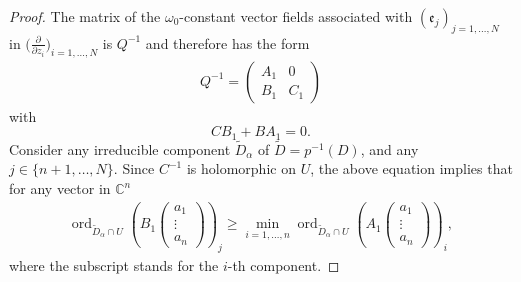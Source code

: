 \documentclass[10pt,a4paper]{amsart}
\newcommand{\der}[2]{\frac{\partial #1}{\partial#2}}
\numberwithin{equation}{section}
\begin{document}
\begin{proof}
The matrix of the $\omega_0$-constant vector fields associated with $(\mathfrak{e}_j)_{j=1,\dots,N}$ in $\big(\der{}{z_i}\big)_{i=1,\dots,N}$ is $Q^{-1}$ and therefore has the form
\begin{align*}%
Q^{-1}= \begin{pmatrix} A_1 & 0 \\ B_1 & C_1\end{pmatrix} \end{align*}
 with
\[
CB_1+BA_1 =0.
\]
Consider any irreducible component $\tilde{D}_\alpha$ of $\tilde{D}=p^{-1}(D)$, and any $j\in \{n+1,\dots,N\}$. Since $C^{-1}$ is holomorphic on $U$, the above equation implies that for any vector in $\mathbb{C}^n$
\begin{align}\label{ordres}
 \operatorname{ord}_{\tilde{D}_\alpha \cap U}  \left(B_1 \begin{pmatrix} a_1\\ \vdots \\ a_n \end{pmatrix}\right)_j \geq \min_{i=1,\dots,n}
\operatorname{ord}_{\tilde{D}_\alpha \cap U}  \left( A_1\begin{pmatrix}a_1\\\vdots \\ a_n \end{pmatrix}\right)_i, \end{align}
 where the subscript stands for the $i$-th component.


\end{proof}
\end{document}
